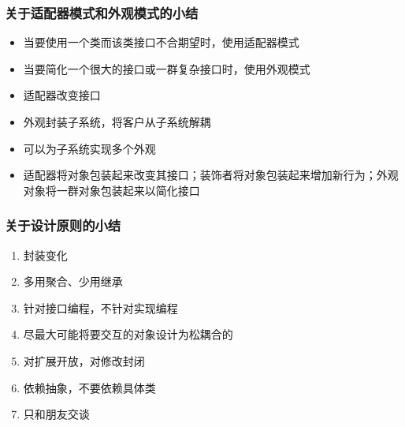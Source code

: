 \documentclass[compress]{beamer}
\begin{document}
\begin{frame}
\frametitle{关于适配器模式和外观模式的小结}
\begin{itemize}
\item 当要使用一个类而该类接口不合期望时，使用适配器模式
\item 当要简化一个很大的接口或一群复杂接口时，使用外观模式
\item 适配器改变接口
\item 外观封装子系统，将客户从子系统解耦
\item 可以为子系统实现多个外观
\item 适配器将对象包装起来改变其接口；装饰者将对象包装起来增加新行为；外观对象将一群对象包装起来以简化接口
\end{itemize}
\end{frame}


\begin{frame}
\frametitle{关于设计原则的小结}
  \begin{enumerate}
    \item 封装变化
    \item 多用聚合、少用继承
    \item 针对接口编程，不针对实现编程
    \item 尽最大可能将要交互的对象设计为松耦合的
    \item 对扩展开放，对修改封闭
    \item 依赖抽象，不要依赖具体类
    \item 只和朋友交谈
  \end{enumerate}
\end{frame}
\end{document}
